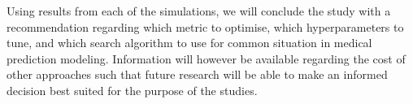 \documentclass{article}
\begin{document}
Using results from each of the simulations, we will conclude the study with a recommendation regarding which metric to optimise, which hyperparameters to tune, and which search algorithm to use for common situation in medical prediction modeling. Information will however be available regarding the cost of other approaches such that future research will be able to make an informed decision best suited for the purpose of the studies.

\newpage

\nocite{*}
\printbibliography[title={References},category=cited]
\printbibliography[title={Further Reading},notcategory=cited]

\end{document}
